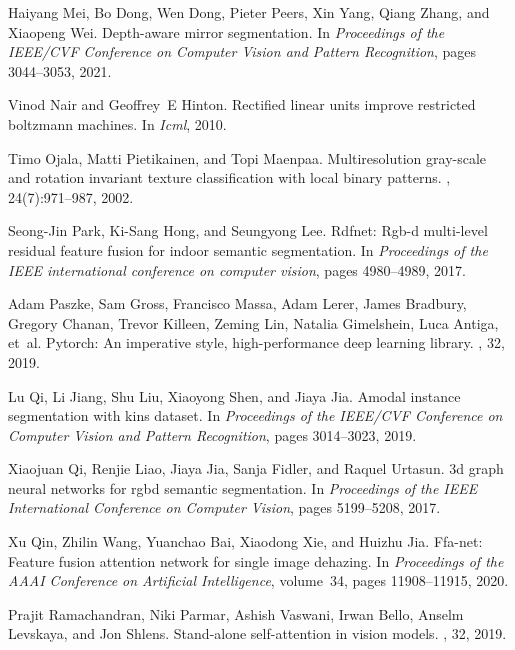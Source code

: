 \documentclass[10pt,twocolumn,letterpaper]{article}
\begin{document}
\begin{thebibliography}{10}
Haiyang Mei, Bo Dong, Wen Dong, Pieter Peers, Xin Yang, Qiang Zhang, and
  Xiaopeng Wei.
\newblock Depth-aware mirror segmentation.
\newblock In {\em Proceedings of the IEEE/CVF Conference on Computer Vision and
  Pattern Recognition}, pages 3044--3053, 2021.

Vinod Nair and Geoffrey~E Hinton.
\newblock Rectified linear units improve restricted boltzmann machines.
\newblock In {\em Icml}, 2010.

Timo Ojala, Matti Pietikainen, and Topi Maenpaa.
\newblock Multiresolution gray-scale and rotation invariant texture
  classification with local binary patterns.
,
  24(7):971--987, 2002.

Seong-Jin Park, Ki-Sang Hong, and Seungyong Lee.
\newblock Rdfnet: Rgb-d multi-level residual feature fusion for indoor semantic
  segmentation.
\newblock In {\em Proceedings of the IEEE international conference on computer
  vision}, pages 4980--4989, 2017.

Adam Paszke, Sam Gross, Francisco Massa, Adam Lerer, James Bradbury, Gregory
  Chanan, Trevor Killeen, Zeming Lin, Natalia Gimelshein, Luca Antiga, et~al.
\newblock Pytorch: An imperative style, high-performance deep learning library.
, 32, 2019.

Lu Qi, Li Jiang, Shu Liu, Xiaoyong Shen, and Jiaya Jia.
\newblock Amodal instance segmentation with kins dataset.
\newblock In {\em Proceedings of the IEEE/CVF Conference on Computer Vision and
  Pattern Recognition}, pages 3014--3023, 2019.

Xiaojuan Qi, Renjie Liao, Jiaya Jia, Sanja Fidler, and Raquel Urtasun.
\newblock 3d graph neural networks for rgbd semantic segmentation.
\newblock In {\em Proceedings of the IEEE International Conference on Computer
  Vision}, pages 5199--5208, 2017.

Xu Qin, Zhilin Wang, Yuanchao Bai, Xiaodong Xie, and Huizhu Jia.
\newblock Ffa-net: Feature fusion attention network for single image dehazing.
\newblock In {\em Proceedings of the AAAI Conference on Artificial
  Intelligence}, volume~34, pages 11908--11915, 2020.

Prajit Ramachandran, Niki Parmar, Ashish Vaswani, Irwan Bello, Anselm Levskaya,
  and Jon Shlens.
\newblock Stand-alone self-attention in vision models.
, 32, 2019.


\end{thebibliography}
\end{document}
